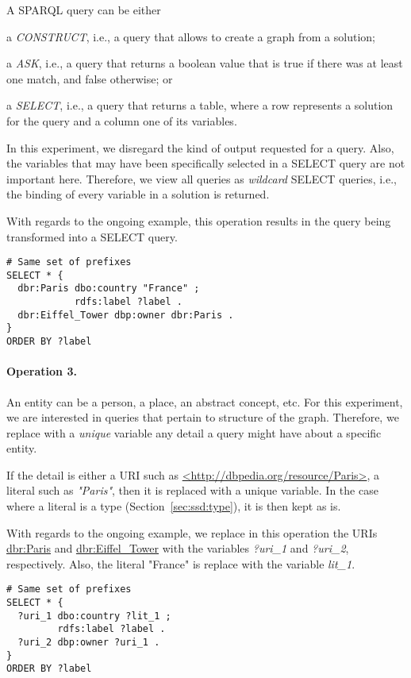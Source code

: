 A SPARQL query can be either
\begin{inparaenum}[(i)]
	\item a \emph{CONSTRUCT}, i.e., a query that allows to create a graph from a solution;
	\item a \emph{ASK}, i.e., a query that returns a boolean value that is true if there was at least one match, and false otherwise; or
	\item a \emph{SELECT}, i.e., a query that returns a table, where a row represents a solution for the query and a column one of its variables.
\end{inparaenum}

In this experiment, we disregard the kind of output requested for a query. Also, the variables that may have been specifically selected in a SELECT query are not important here. Therefore, we view all queries as \emph{wildcard} SELECT queries, i.e., the binding of every variable in a solution is returned.

With regards to the ongoing example, this operation results in the query being transformed into a SELECT query.
\begin{verbatim}
# Same set of prefixes
SELECT * {
  dbr:Paris dbo:country "France" ;
            rdfs:label ?label .
  dbr:Eiffel_Tower dbp:owner dbr:Paris .
}
ORDER BY ?label
\end{verbatim}

\paragraph{Operation 3.}

An entity can be a person, a place, an abstract concept, etc. For this experiment, we are interested in queries that pertain to structure of the graph. Therefore, we replace with a \emph{unique} variable any detail a query might have about a specific entity.

If the detail is either a URI such as \href{http://dbpedia.org/resource/Paris}{<http://dbpedia.org/resource/Paris>}, a literal such as \emph{"Paris"}, then it is replaced with a unique variable. In the case where a literal is a type (Section~\ref{sec:ssd:type}), it is then kept as is.

With regards to the ongoing example, we replace in this operation the URIs \href{http://dbpedia.org/resource/Paris}{dbr:Paris} and \href{http://dbpedia.org/resource/Eiffel\_Tower}{dbr:Eiffel\_Tower} with the variables \emph{?uri\_1} and \emph{?uri\_2}, respectively. Also, the literal "France" is replace with the variable \emph{lit\_1}.
\begin{verbatim}
# Same set of prefixes
SELECT * {
  ?uri_1 dbo:country ?lit_1 ;
         rdfs:label ?label .
  ?uri_2 dbp:owner ?uri_1 .
}
ORDER BY ?label
\end{verbatim}

